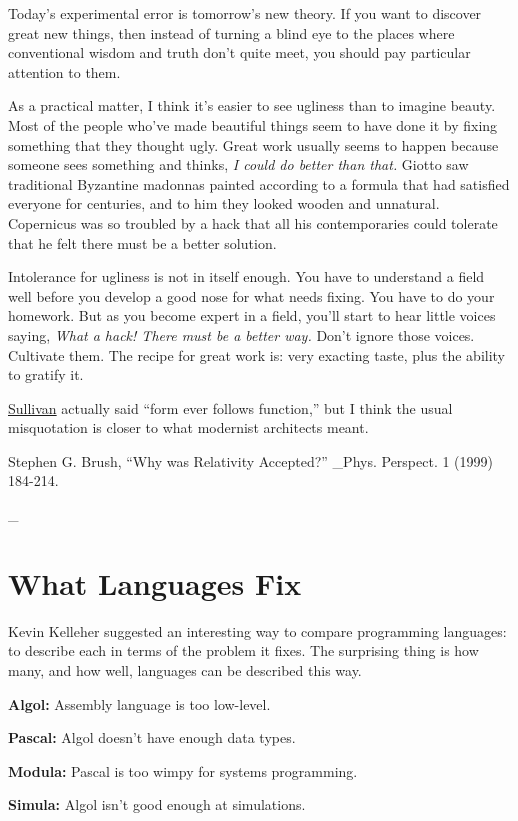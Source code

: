 \documentclass[12pt]{book}
\begin{document}
Today's experimental error is tomorrow's new theory. If you want to
discover great new things, then instead of turning a blind eye to the
places where conventional wisdom and truth don't quite meet, you should
pay particular attention to them.

As a practical matter, I think it's easier to see ugliness than to
imagine beauty. Most of the people who've made beautiful things seem to
have done it by fixing something that they thought ugly. Great work
usually seems to happen because someone sees something and thinks,
\emph{I could do better than that.} Giotto saw traditional Byzantine
madonnas painted according to a formula that had satisfied everyone for
centuries, and to him they looked wooden and unnatural. Copernicus was
so troubled by a hack that all his contemporaries could tolerate that he
felt there must be a better solution.

Intolerance for ugliness is not in itself enough. You have to understand
a field well before you develop a good nose for what needs fixing. You
have to do your homework. But as you become expert in a field, you'll
start to hear little voices saying, \emph{What a hack! There must be a
better way.} Don't ignore those voices. Cultivate them. The recipe for
great work is: very exacting taste, plus the ability to gratify it.


\href{https://sep.turbifycdn.com/ty/cdn/paulgraham/sullivan.html?t=1688221954&}{Sullivan}
actually said ``form ever follows function,'' but I think the usual
misquotation is closer to what modernist architects meant.

Stephen G. Brush, ``Why was Relativity Accepted?'' \_Phys. Perspect. 1
(1999) 184-214.

\_
\chapter{What Languages Fix}

Kevin Kelleher suggested an interesting way to compare programming
languages: to describe each in terms of the problem it fixes. The
surprising thing is how many, and how well, languages can be described
this way.

\textbf{Algol:} Assembly language is too low-level.

\textbf{Pascal:} Algol doesn't have enough data types.

\textbf{Modula:} Pascal is too wimpy for systems programming.

\textbf{Simula:} Algol isn't good enough at simulations.
\end{document}

